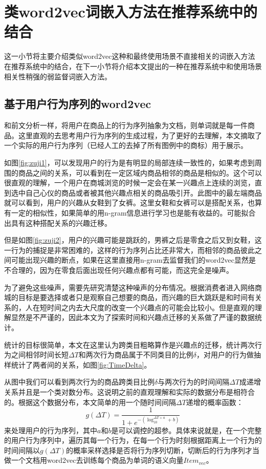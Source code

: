 \section{类word2vec词嵌入方法在推荐系统中的结合}
这一小节将主要介绍类似word2vec这种和最终使用场景不直接相关的词嵌入方法在推荐系统中的结合，在下一小节将介绍本文提出的一种在推荐系统中和使用场景相关性稍强的弱监督词嵌入方法。

\subsection{基于用户行为序列的word2vec}
和前文分析一样，将用户在商品上的行为序列抽象为文档，则单词就是每一件商品。这里直观的去思考用户行为序列的生成过程，为了更好的去理解，本文摘取了一个实际的用户行为序列（已经人工的去掉了所有图例中的商标）用于展示。

如图\ref{fig:zuji1}，可以发现用户的行为是有明显的局部连续一致性的，如果考虑到周围的商品之间的关系，可以看到在一定区域内商品相邻的商品是相似的。这个可以很直观的理解，一个用户在商城浏览的时候一定会在某一兴趣点上连续的浏览，直到选中自己心仪的商品或者被其他兴趣点相关的商品吸引开。此图中的最左端商品就可以看到，用户的兴趣从女鞋到了女裤。这里女鞋和女裤可以是搭配关系，也算有一定的相似性，如果简单的用n-gram信息进行学习也是能有收益的。可能拟合出具有这种搭配关系的兴趣迁移。

但是如图\ref{fig:zuji2}，用户的兴趣可能是跳跃的，男裤之后是零食之后又到女鞋，这一行为的捕捉是非常困难的，这样的行为序列占比还非常大，而相邻的商品彼此之间可能出现兴趣的断点，如果在这里直接用n-gram去监督我们的word2vec显然是不合理的，因为在零食后面出现任何兴趣点都有可能，而这完全是噪声。

为了避免这些噪声，需要先研究清楚这种噪声的分布情况。根据消费者进入网络商城的目标是要选择或者只是观察自己想要的商品，而兴趣的巨大跳跃是和时间有关系的，人在短时间之内去大尺度的改变一个兴趣点的可能会比较小。但是直观的理解显然是不严谨的，因此本文为了探索时间和兴趣点迁移的关系做了严谨的数据统计。

统计的目标很简单，本文在这里认为跨类目粗略算作是兴趣点的迁移，统计两次行为之间相邻时间长短$\Delta T$和两次行为商品属于不同类目的比例$\delta$，对用户的行为做抽样统计了两者间的关系，如图\ref{fig:TimeDelta}。

从图中我们可以看到两次行为的商品跨类目比例$\delta$与两次行为的时间间隔$\Delta T$成递增关系并且是一个类对数分布。这说明之前的直观理解和实际的数据分布是相符合的。根据这个数据分布，本文简单的用一个随时间间隔$\Delta T$递增的概率函数：
\begin{equation}
g(\Delta T) = \frac{1}{1 + e^{- (\log_{10}^{\Delta T + a} + b)}}	
\end{equation}
来处理用户的行为序列，其中$a$和$b$是可以调控的超参。具体来说就是，在一个完整的用户行为序列中，遍历其每一个行为，在每一个行为时刻根据距离上一个行为的时间间隔以$g(\Delta T)$的概率采样选择是否将行为序列切断，切断后的行为序列才当做一个文档用word2vec去训练每个商品为单词的语义向量$Item_{vec}$。

